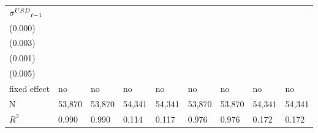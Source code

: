 \begin{tabular}{lllllllll}
${{\it \sigma}^{USD}}_{t-1}$ &                          \makecell{} &  \makecell{$-0.001^{***}$ \\ (0.000)} &                          \makecell{} &  \makecell{$-0.036^{***}$ \\ (0.003)} &                          \makecell{} &  \makecell{$-0.003^{***}$ \\ (0.001)} &                          \makecell{} &  \makecell{$-0.019^{***}$ \\ (0.005)} \\
\midrule fixed effect        &                                   no &                                    no &                                   no &                                    no &                                   no &                                    no &                                   no &                                    no \\
N                            &                               53,870 &                                53,870 &                               54,341 &                                54,341 &                               53,870 &                                53,870 &                               54,341 &                                54,341 \\
$R^2$                        &                                0.990 &                                 0.990 &                                0.114 &                                 0.117 &                                0.976 &                                 0.976 &                                0.172 &                                 0.172 \\
\bottomrule
\end{tabular}

